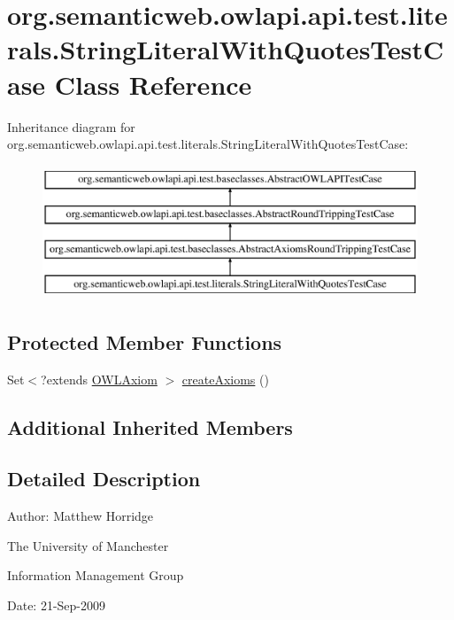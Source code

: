 \hypertarget{classorg_1_1semanticweb_1_1owlapi_1_1api_1_1test_1_1literals_1_1_string_literal_with_quotes_test_case}{\section{org.\-semanticweb.\-owlapi.\-api.\-test.\-literals.\-String\-Literal\-With\-Quotes\-Test\-Case Class Reference}
\label{classorg_1_1semanticweb_1_1owlapi_1_1api_1_1test_1_1literals_1_1_string_literal_with_quotes_test_case}
}
Inheritance diagram for org.\-semanticweb.\-owlapi.\-api.\-test.\-literals.\-String\-Literal\-With\-Quotes\-Test\-Case\-:\begin{figure}[H]
\begin{center}
\leavevmode
\includegraphics[height=4.000000cm]{classorg_1_1semanticweb_1_1owlapi_1_1api_1_1test_1_1literals_1_1_string_literal_with_quotes_test_case}
\end{center}
\end{figure}
\subsection*{Protected Member Functions}
\begin{DoxyCompactItemize}
\item 
Set$<$?extends \hyperlink{interfaceorg_1_1semanticweb_1_1owlapi_1_1model_1_1_o_w_l_axiom}{O\-W\-L\-Axiom} $>$ \hyperlink{classorg_1_1semanticweb_1_1owlapi_1_1api_1_1test_1_1literals_1_1_string_literal_with_quotes_test_case_a311637a329a90a40319497de83d59cc4}{create\-Axioms} ()
\end{DoxyCompactItemize}
\subsection*{Additional Inherited Members}


\subsection{Detailed Description}
Author\-: Matthew Horridge\par
 The University of Manchester\par
 Information Management Group\par
 Date\-: 21-\/\-Sep-\/2009 

